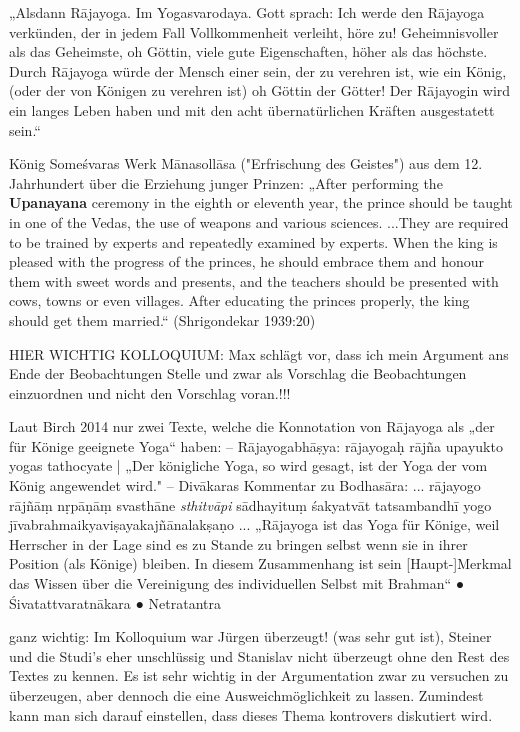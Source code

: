 {„Alsdann Rājayoga. Im Yogasvarodaya. Gott sprach:
Ich werde den Rājayoga verkünden, der in jedem Fall Vollkommenheit verleiht, höre zu!
Geheimnisvoller als das Geheimste, oh Göttin, viele gute Eigenschaften, höher als das höchste. 
Durch Rājayoga würde der Mensch einer sein, der zu verehren ist, wie ein König,(oder der von Königen zu verehren ist) oh Göttin der
Götter! Der Rājayogin wird ein langes Leben haben und mit den acht übernatürlichen Kräften
ausgestatett sein.“



König Someśvaras Werk Mānasollāsa ("Erfrischung des Geistes") aus dem 12. Jahrhundert über
die Erziehung junger Prinzen:
„After performing the \textbf{Upanayana} ceremony in the eighth or eleventh year, the prince should be taught in
one of the Vedas, the use of weapons and various sciences. ...They are required to be trained by experts
and repeatedly examined by experts. When the king is pleased with the progress of the princes, he
should embrace them and honour them with sweet words and presents, and the teachers should be
presented with cows, towns or even villages. After educating the princes properly, the king should get
them married.“
(Shrigondekar 1939:20)

HIER WICHTIG KOLLOQUIUM: Max schlägt vor, dass ich mein Argument ans Ende der Beobachtungen Stelle und zwar als Vorschlag die Beobachtungen einzuordnen und nicht den Vorschlag voran.!!!



Laut Birch 2014 nur zwei Texte, welche die Konnotation von Rājayoga als „der für Könige geeignete Yoga“ haben:
–
Rājayogabhāṣya:
rājayogaḥ rājña upayukto yogas tathocyate |
„Der königliche Yoga, so wird gesagt, ist der Yoga der vom König angewendet wird."
–
Divākaras Kommentar zu Bodhasāra:
... rājayogo rājñāṃ nṛpāṇāṃ svasthāne \emph{sthitvāpi} sādhayituṃ śakyatvāt tatsambandhī yogo
jīvabrahmaikyaviṣayakajñānalakṣaṇo ...
„Rājayoga ist das Yoga für Könige, weil Herrscher in der Lage sind es zu Stande zu bringen selbst wenn sie in ihrer Position
(als Könige) bleiben. In diesem Zusammenhang ist sein [Haupt-]Merkmal das Wissen über die Vereinigung des
individuellen Selbst mit Brahman“
● Śivatattvaratnākara
● Netratantra


ganz wichtig: Im Kolloquium war Jürgen überzeugt! (was sehr gut ist), Steiner und die Studi's eher unschlüssig und Stanislav nicht überzeugt ohne den Rest des Textes zu kennen. 
Es ist sehr wichtig in der Argumentation zwar zu versuchen zu überzeugen, aber dennoch die eine Ausweichmöglichkeit zu lassen. Zumindest kann man sich darauf einstellen, dass dieses Thema kontrovers diskutiert wird.

}
